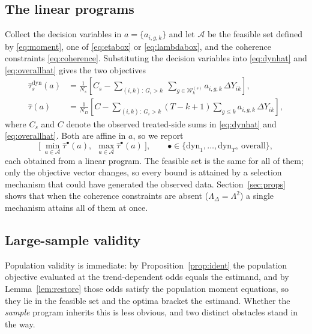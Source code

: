 \documentclass[12pt]{article}
\theoremstyle{remark}
\begin{document}
\subsection{The linear programs}
\label{sec:lp}

Collect the decision variables in $a = \{a_{i,g,k}\}$ and let $\mathcal{A}$ be the feasible
set defined by \eqref{eq:moment}, one of \eqref{eq:etabox} or \eqref{eq:lambdabox}, and the
coherence constraints \eqref{eq:coherence}. Substituting the decision variables into \eqref{eq:dynhat} and
\eqref{eq:overallhat} gives the two objectives
\begin{align}
\widehat\tau^{\mathrm{dyn}}_s(a)
&= \frac{1}{N_s}\left[ C_s - \sum_{(i,k)\,:\,G_i>k}\ \sum_{g \in \mathcal{W}^{(s)}_k}
   a_{i,g,k}\,\Delta Y_{ik} \right],
\label{eq:objdyn}\\
\widehat\tau(a)
&= \frac{1}{N_D}\left[ C - \sum_{(i,k)\,:\,G_i>k} (T{-}k{+}1) \sum_{g \le k}
   a_{i,g,k}\,\Delta Y_{ik} \right],
\label{eq:objoverall}
\end{align}
where $C_s$ and $C$ denote the observed treated-side sums in \eqref{eq:dynhat} and
\eqref{eq:overallhat}. Both are affine in $a$, so we report
\begin{equation}
\Big[\ \min_{a \in \mathcal{A}} \widehat\tau^{\bullet}(a),\ \
        \max_{a \in \mathcal{A}} \widehat\tau^{\bullet}(a)\ \Big],
\qquad \bullet \in \{\mathrm{dyn}_1, \ldots, \mathrm{dyn}_T,\ \text{overall}\},
\label{eq:lp}
\end{equation}
each obtained from a linear program. The feasible set is the same for all of them; only
the objective vector changes, so every bound is attained by a selection mechanism that
could have generated the observed data. Section~\ref{sec:props} shows that when the
coherence constraints are absent ($\Lambda_\Delta = \Lambda^2$) a single mechanism
attains all of them at once.

\subsection{Large-sample validity}
\label{sec:valid}

Population validity is immediate: by Proposition~\ref{prop:ident} the population objective
evaluated at the trend-dependent odds equals the estimand, and by Lemma~\ref{lem:restore}
those odds satisfy the population moment equations, so they lie in the feasible set and
the optima bracket the estimand. Whether the \emph{sample} program inherits this is less
obvious, and two distinct obstacles stand in the way.
\end{document}
